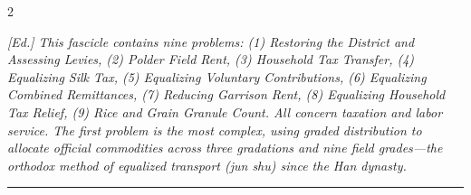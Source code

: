 \documentclass[11pt,a4paper]{article}
\newcommand{\longline}{\noindent\rule{\textwidth}{0.4pt}}
\newcommand{\EdNoteEn}[1]{\par\noindent\textit{\color{ednotecolor}[Ed.] #1}\par}
\begin{document}
\begin{paracol}{2}
\switchcolumn

\EdNoteEn{This fascicle contains nine problems: (1) Restoring the District and Assessing Levies, (2) Polder Field Rent, (3) Household Tax Transfer, (4) Equalizing Silk Tax, (5) Equalizing Voluntary Contributions, (6) Equalizing Combined Remittances, (7) Reducing Garrison Rent, (8) Equalizing Household Tax Relief, (9) Rice and Grain Granule Count. All concern taxation and labor service. The first problem is the most complex, using graded distribution to allocate official commodities across three gradations and nine field grades---the orthodox method of equalized transport (jun shu) since the Han dynasty.}

\end{paracol}

\longline

\end{document}
